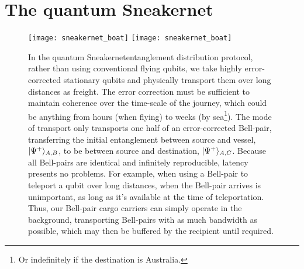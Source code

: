 %
%

\section{The quantum Sneakernet\texttrademark}


\begin{figure}[!htbp]
\pubmode
\texttt{[image: sneakernet\_boat]}
\else
\texttt{[image: sneakernet\_boat]}
\fi
\caption{In the quantum Sneakernet\texttrademark entanglement distribution protocol, rather than using conventional flying qubits, we take highly error-corrected stationary qubits and physically transport them over long distances as freight. The error correction must be sufficient to maintain coherence over the time-scale of the journey, which could be anything from hours (when flying) to weeks (by sea\footnote{Or indefinitely if the destination is Australia.}). The mode of transport only transports one half of an error-corrected Bell-pair, transferring the initial entanglement between source and vessel, $|\Psi^+\rangle_{A,B}$, to be between source and destination, $|\Psi^+\rangle_{A,C}$. Because all Bell-pairs are identical and infinitely reproducible, latency presents no problems. For example, when using a Bell-pair to teleport a qubit over long distances, when the Bell-pair arrives is unimportant, as long as it's available at the time of teleportation. Thus, our Bell-pair cargo carriers can simply operate in the background, transporting Bell-pairs with as much bandwidth as possible, which may then be buffered by the recipient until required.}\label{fig:sneakernet_boat}	
\end{figure}
